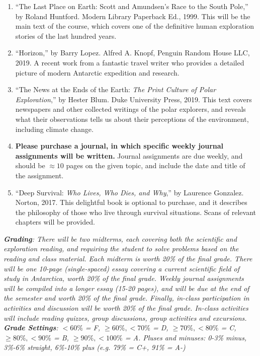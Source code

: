 \documentclass[10pt]{article}
\begin{document}
\begin{enumerate}
\item ``The Last Place on Earth: Scott and Amundsen's Race to the South Pole,'' by Roland Huntford.  Modern Library Paperback Ed., 1999.  This will be the main text of the course, which covers one of the definitive human exploration stories of the last hundred years.
\item ``Horizon,'' by Barry Lopez.  Alfred A. Knopf, Penguin Random House LLC, 2019.  A recent work from a fantastic travel writer who provides a detailed picture of modern Antarctic expedition and research.
\item ``The News at the Ends of the Earth: \textit{The Print Culture of Polar Exploration},'' by Hester Blum. Duke University Press, 2019.  This text covers newspapers and other collected writings of the polar explorers, and reveals what their observations tells us about their perceptions of the environment, including climate change.
\item \textbf{Please purchase a journal, in which specific weekly journal assignments will be written.}  Journal assignments are due weekly, and should be $\approx 10$ pages on the given topic, and include the date and title of the assignment.
\item ``Deep Survival: \textit{Who Lives, Who Dies, and Why},'' by Laurence Gonzalez.  Norton, 2017.  This delightful book is optional to purchase, and it describes the philosophy of those who live through survival situations.  Scans of relevant chapters will be provided.
\end{enumerate}
\textit{\textbf{Grading}: There will be two midterms, each covering both the scientific and exploration reading, and requiring the student to solve problems based on the reading and class material. Each midterm is worth 20\% of the final grade. There will be one 10-page (single-spaced) essay covering a current scientific field of study in Antarctica, worth 20\% of the final grade. Weekly journal assignments will be compiled into a longer essay (15-20 pages), and will be due at the end of the semester and worth 20\% of the final grade.  Finally, in-class participation in activities and discussion will be worth 20\% of the final grade.  In-class activities will include reading quizzes, group discussions, group activities and excursions.} \\
\textit{\textbf{Grade Settings}: $<60\%$ = F, $\geq 60\%, <70\%$ = D, $\geq 70\%, <80\%$ = C, $\geq 80\%, <90\%$ = B, $\geq 90\%, <100\%$ = A.  Pluses and minuses: 0-3\% minus, 3\%-6\% straight, 6\%-10\% plus (e.g. 79\% = C+, 91\% = A-)} \\
\end{document}
